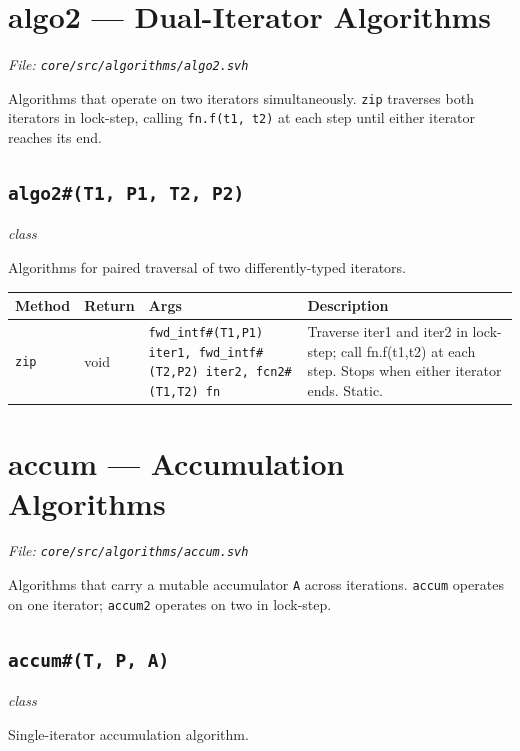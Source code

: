 \documentclass[11pt,letterpaper]{report}
\begin{document}
\section{algo2 --- Dual-Iterator Algorithms}
\noindent\small\textit{File: \texttt{core/src/algorithms/algo2.svh}}\par

Algorithms that operate on two iterators simultaneously. \texttt{zip} traverses both iterators in lock-step, calling \texttt{fn.f(t1, t2)} at each step until either iterator reaches its end.

\subsection*{\texttt{algo2\#(T1, P1, T2, P2)}}
\noindent\small\textit{class}\par

Algorithms for paired traversal of two differently-typed iterators.

\begin{xltabular}{\linewidth}{>{\small}p{1.35in} >{\small}p{1.25in} >{\small}p{0.95in} >{\small}X}
\toprule
\textbf{Method} & \textbf{Return} & \textbf{Args} & \textbf{Description} \\
\midrule
\endhead
\bottomrule
\endfoot
\texttt{zip} & void & \texttt{fwd\_intf\#(T1,P1) iter1, fwd\_intf\#(T2,P2) iter2, fcn2\#(T1,T2) fn} & Traverse iter1 and iter2 in lock-step; call fn.f(t1,t2) at each step. Stops when either iterator ends. Static. \\
\end{xltabular}

\section{accum --- Accumulation Algorithms}
\noindent\small\textit{File: \texttt{core/src/algorithms/accum.svh}}\par

Algorithms that carry a mutable accumulator \texttt{A} across iterations. \texttt{accum} operates on one iterator; \texttt{accum2} operates on two in lock-step.

\subsection*{\texttt{accum\#(T, P, A)}}
\noindent\small\textit{class}\par

Single-iterator accumulation algorithm.
\end{document}
